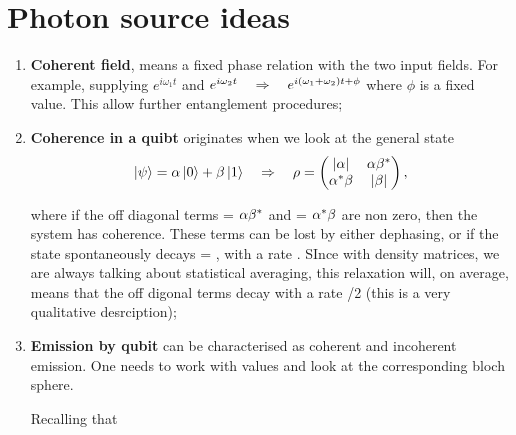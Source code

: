 \section{Photon source ideas\label{sec:newIdeas}}
\begin{enumerate}
	\item \textbf{Coherent field}, means a fixed phase relation with the two input fields. For example, supplying $ e^{i\omega_1t} $ and $ e^{i\omega_2t} \quad\Rightarrow\quad e^{i(\omega_1+\omega_2)t + \phi}$ where $ \phi $ is a fixed value. This allow further entanglement procedures;
	\item \textbf{Coherence in a quibt} originates when we look at the general state\begin{equation}\label{key}
	\Ket{\psi} = \alpha\Ket{0}+\beta\Ket{1} \quad\Rightarrow\quad \rho = \begin{pmatrix}\left|\alpha\right|&\alpha\beta^{*}\\\alpha^{*}\beta&\left|\beta\right|\end{pmatrix},
	\end{equation}
	
	\noindent where if the off diagonal terms  = $ \alpha\beta^{*} $ and  = $ \alpha^{*}\beta $ are non zero, then the system has coherence. These terms can be lost by either dephasing, or if the state spontaneously decays \irho{} \ra {} = , with a rate . SInce with density matrices, we are always talking about statistical averaging, this relaxation will, on average, means that the off digonal terms decay with a rate /2 (this is a very qualitative desrciption);
	\item \textbf{Emission by qubit} can be characterised as coherent and incoherent emission. One needs to work with  values and look at the corresponding bloch sphere. 
	
	\begin{figure}[h]
	\end{figure}
	
	Recalling that
	
	

\end{enumerate}
